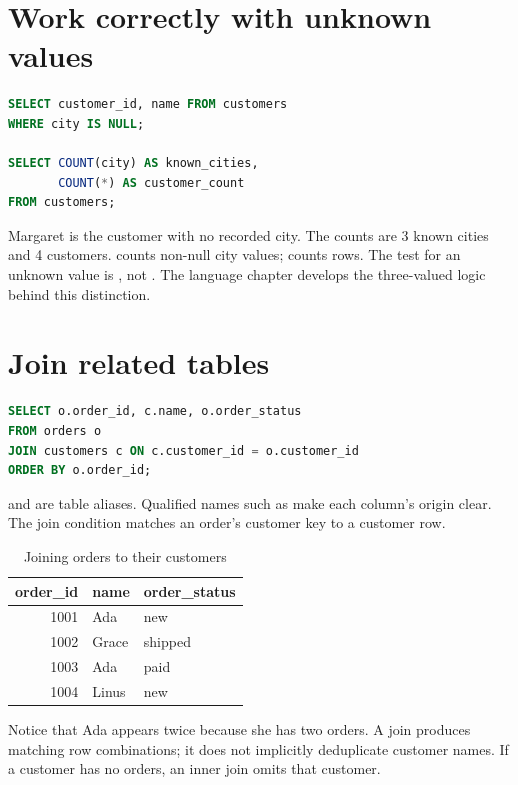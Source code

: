 \section{Work correctly with unknown values}
\begin{lstlisting}[language=SQL]
SELECT customer_id, name FROM customers
WHERE city IS NULL;

SELECT COUNT(city) AS known_cities,
       COUNT(*) AS customer_count
FROM customers;
\end{lstlisting}
Margaret is the customer with no recorded city. The counts are 3 known cities
and 4 customers.  counts non-null city values;
 counts rows. The test for an unknown value is
, not . The language chapter develops the
three-valued logic behind this distinction.


\section{Join related tables}
\begin{lstlisting}[language=SQL]
SELECT o.order_id, c.name, o.order_status
FROM orders o
JOIN customers c ON c.customer_id = o.customer_id
ORDER BY o.order_id;
\end{lstlisting}
 and  are table aliases. Qualified names such as
 make each column's origin clear. The join condition
matches an order's customer key to a customer row.

\begin{table}[htbp]\centering
\caption{Joining orders to their customers}
\begin{tabular}{r l l}\toprule
order\_id & name & order\_status\\\midrule
1001 & Ada & new\\
1002 & Grace & shipped\\
1003 & Ada & paid\\
1004 & Linus & new\\\bottomrule
\end{tabular}
\end{table}
Notice that Ada appears twice because she has two orders. A join produces
matching row combinations; it does not implicitly deduplicate customer
names. If a customer has no orders, an inner join omits that customer.

